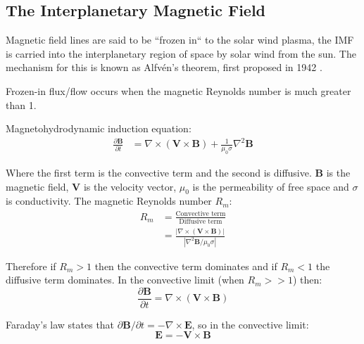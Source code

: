 \documentclass[12pt]{article}
\newcommand{\incfig}[2][1]{
    \def\svgwidth{#1\textwidth}
    
}
\begin{document}
\subsection{The Interplanetary Magnetic Field}
Magnetic field lines are said to be ``frozen in`` to the solar wind plasma, the IMF is carried into the interplanetary region of space by solar wind from the sun. The mechanism for this is known as Alfvén's theorem, first proposed in 1942 \cite{alfven_1942}. 

Frozen-in flux/flow occurs when the magnetic Reynolds number is much greater than 1.

Magnetohydrodynamic induction equation:
\begin{align}
    \frac{\partial \textbf{B}}{\partial t} &= \nabla \times (\textbf{V}\times\textbf{B})+\frac{1}{\mu_0\sigma}\nabla^2\textbf{B}
\end{align}

Where the first term is the convective term and the second is diffusive. $\textbf{B}$ is the magnetic field, \textbf{V} is the velocity vector, $\mu_0$ is the permeability of free space and $\sigma$ is conductivity. The magnetic Reynolds number $R_m$:
\begin{align}
    R_m&=\frac{\text{Convective term}}{\text{Diffusive term}} \nonumber\\
    &=\frac{|\nabla\times(\textbf{V}\times\textbf{B})|}{|\nabla^2\textbf{B}/\mu_0\sigma|}
\end{align}

Therefore if $R_m>1$ then the convective term dominates and if $R_m<1$ the diffusive term dominates. In the convective limit (when $R_m>>1$) then:
\begin{equation}
    \frac{\partial\textbf{B}}{\partial t}=\nabla\times(\textbf{V}\times\textbf{B})
    \label{eq:convLim}
\end{equation}

Faraday's law states that $\partial\textbf{B}/\partial t=-\nabla\times\textbf{E}$, so in the convective limit:
\begin{equation}
    \textbf{E}=-\textbf{V}\times\textbf{B}
\end{equation}

\begin{figure}
    \hspace{1.5cm}
    \vspace{-5mm}
    \incfig[0.38]{frozen-in}
    \vspace{5mm}
\end{figure}
\end{document}

